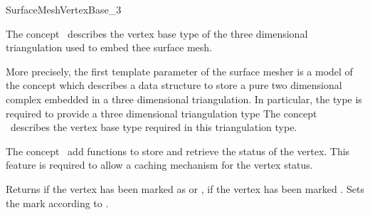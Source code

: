 

\begin{ccRefConcept}{SurfaceMeshVertexBase_3}


\ccDefinition
  
The concept \ccRefName\ describes the vertex base type
of the three dimensional triangulation used
to embed thee surface mesh.

More precisely,
the first template parameter  of the surface mesher
is a model of the concept 
which describes a data structure to store
a pure two dimensional complex 
embedded in a three dimensional triangulation.
In particular, the type  is required to provide
a three dimensional triangulation type
The concept \ccRefName\ describes the vertex base type
required in this triangulation type.





\ccGeneralizes


The concept \ccRefName\ 
add functions to store and retrieve the status of the vertex.
This feature is required to allow a caching mechanism
for the vertex status.




\ccCreation
{}  %


\ccOperations

{Returns  if the vertex  has been marked as 
or \ccc{BOUNDARY}, \ccc{false} if the vertex has been marked .} 
\ccGlue
{}
{ Sets the  mark according to .}


\end{ccRefConcept}
